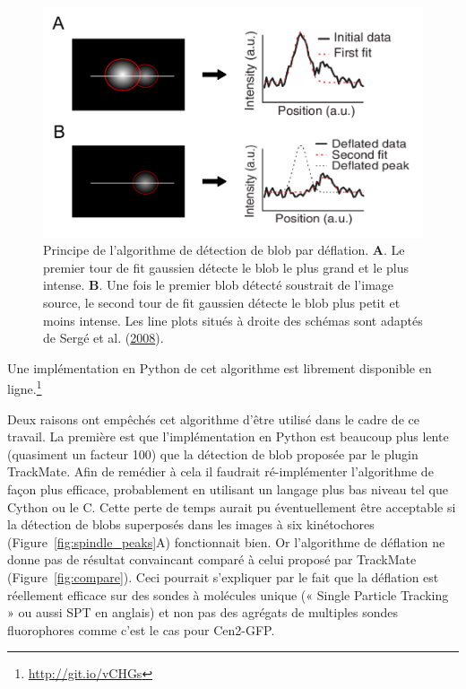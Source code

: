 \documentclass[12pt,a4paper,twoside,openright]{book}
\begin{document}
\begin{figure}[htbp]
\centering
\includegraphics{figures/results/imaging/deflation.png}
\caption[Principe de l'algorithme de détection de blob par déflation]{\label{fig:deflation}Principe
de l'algorithme de détection de blob par déflation. \textbf{A}. Le
premier tour de fit gaussien détecte le blob le plus grand et le plus
intense. \textbf{B}. Une fois le premier blob détecté soustrait de
l'image source, le second tour de fit gaussien détecte le blob plus
petit et moins intense. Les line plots situés à droite des schémas sont
adaptés de Sergé et al. (\hyperref[ref-Serge2008]{2008}).}
\end{figure}

Une implémentation en Python de cet algorithme est librement disponible
en ligne.\footnote{\url{http://git.io/vCHGs}}

Deux raisons ont empêchés cet algorithme d'être utilisé dans le cadre de
ce travail. La première est que l'implémentation en Python est beaucoup
plus lente (quasiment un facteur 100) que la détection de blob proposée
par le plugin TrackMate. Afin de remédier à cela il faudrait
ré-implémenter l'algorithme de façon plus efficace, probablement en
utilisant un langage plus bas niveau tel que Cython ou le C. Cette perte
de temps aurait pu éventuellement être acceptable si la détection de
blobs superposés dans les images à six kinétochores
(Figure~\ref{fig:spindle_peaks}A) fonctionnait bien. Or l'algorithme de
déflation ne donne pas de résultat convaincant comparé à celui proposé
par TrackMate (Figure~\ref{fig:compare}). Ceci pourrait s'expliquer par
le fait que la déflation est réellement efficace sur des sondes à
molécules unique (« Single Particle Tracking » ou aussi SPT en anglais)
et non pas des agrégats de multiples sondes fluorophores comme c'est le
cas pour Cen2-GFP.
\end{document}
